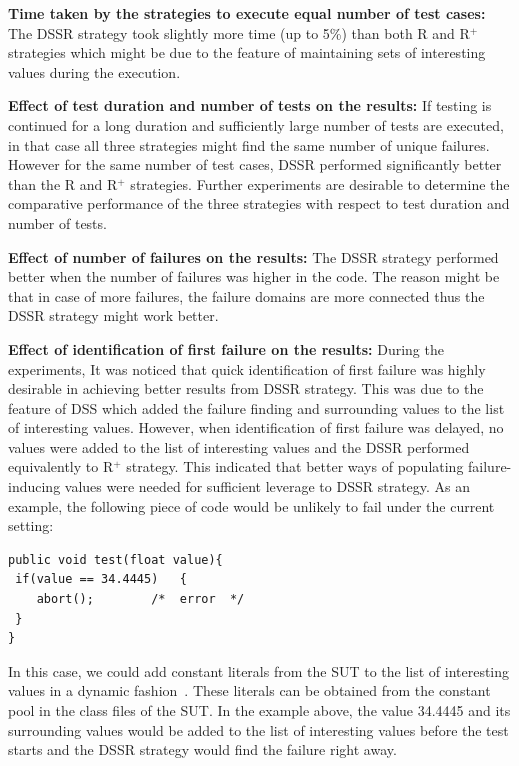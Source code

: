 \textbf{Time taken by the strategies to execute equal number of test cases:}
The DSSR strategy took slightly more time (up to 5\%) than both R and R$^+$ strategies which might be due to the feature of maintaining sets of interesting values during the execution. 

\textbf{Effect of test duration and number of tests on the results:}
If testing is continued for a long duration and sufficiently large number of tests are executed, in that case all three strategies might find the same number of unique failures. However for the same number of test cases, DSSR performed significantly better than the R and R$^+$ strategies. Further experiments are desirable to determine the comparative performance of the three strategies with respect to test duration and number of tests.

\textbf{Effect of number of failures on the results:} 
The DSSR strategy performed better when the number of failures was higher in the code. The reason might be that in case of more failures, the failure domains are more connected thus the DSSR strategy might work better.

\textbf{Effect of identification of first failure on the results:}
During the experiments, It was noticed that quick identification of first failure was highly desirable in achieving better results from DSSR strategy. This was due to the feature of DSS which added the failure finding and surrounding values to the list of interesting values. However, when identification of first failure was delayed, no values were added to the list of interesting values and the DSSR performed equivalently to R$^+$ strategy. This indicated that better ways of populating failure-inducing values were needed for sufficient leverage to DSSR strategy. As an example, the following piece of code would be unlikely to fail under the current setting:

\bigskip
\bigskip
\begin{lstlisting}
public void test(float value){
 if(value == 34.4445)   {
 	abort(); 		/*  error  */
 }
}
\end{lstlisting}
\bigskip
\bigskip

In this case, we could add constant literals from the SUT to the list of interesting values in a dynamic fashion~\cite{godefroid2005dart}. These literals can be obtained from the constant pool in the class files of the SUT. In the example above, the value 34.4445 and its surrounding values would  be added to the list of interesting values before the test starts and the DSSR strategy would find the failure right away.

